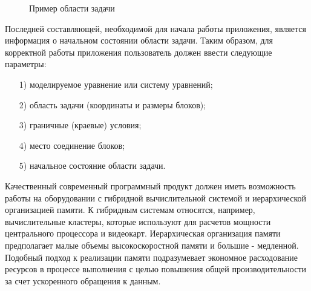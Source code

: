 \documentclass[a4paper, 14pt]{extarticle}
\theoremstyle{definition}
\begin{document}
\begin{figure}[h]
	\caption{Пример области задачи}
	\label{ris:2Block_ex}
\end{figure}

\par Последней составляющей, необходимой для начала работы приложения, является информация о начальном состоянии области задачи. Таким образом, для корректной работы приложения пользователь должен ввести следующие параметры:
\begin{enumerate}
\item[1)] моделируемое уравнение или систему уравнений;
\item[2)] область задачи (координаты и размеры блоков);
\item[3)] граничные (краевые) условия;
\item[4)] место соединение блоков;
\item[5)] начальное состояние области задачи.
\end{enumerate}

\par Качественный современный программный продукт должен иметь возможность работы на оборудовании с гибридной вычислительной системой и иерархической организацией памяти. К гибридным системам относятся, например, вычислительные кластеры, которые используют для расчетов мощности центрального процессора и видеокарт. Иерархическая организация памяти предполагает малые объемы высокоскоростной памяти и большие - медленной. Подобный подход к реализации памяти подразумевает экономное расходование ресурсов в процессе выполнения с целью повышения общей производительности за счет ускоренного обращения к данным.
\end{document}
